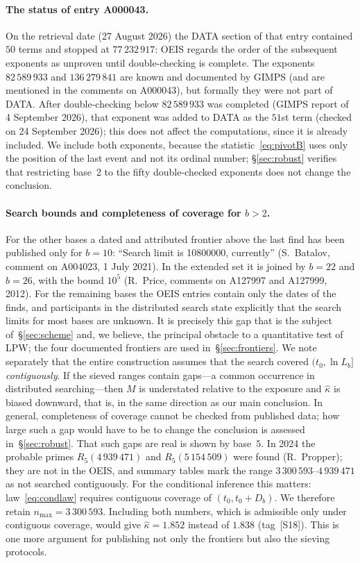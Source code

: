 \documentclass[11pt,a4paper]{article}
\theoremstyle{plain}
\theoremstyle{remark}
\begin{document}
\paragraph{The status of entry A000043.} On the retrieval date (27 August 2026)
the DATA section of that entry contained $50$ terms and stopped at
$77\,232\,917$: OEIS regards the order of the subsequent exponents as unproven
until double-checking is complete. The exponents $82\,589\,933$ and
$136\,279\,841$ are known and documented by GIMPS (and are mentioned in the
comments on A000043), but formally they were not part of DATA. After
double-checking below $82\,589\,933$ was completed (GIMPS report of 4 September
2026), that exponent was added to DATA as the $51$st term (checked on
24 September 2026); this does not affect the computations, since it is already
included. We include both
exponents, because the statistic~\eqref{eq:pivotB} uses only the position
of the last event and not its ordinal number; \S\ref{sec:robust} verifies that
restricting base~2 to the fifty double-checked exponents does not change the
conclusion.

\paragraph{Search bounds and completeness of coverage for $b>2$.} For the other
bases a dated and attributed frontier above the last find has been published
only for $b=10$: ``Search limit is 10800000, currently'' (S.~Batalov, comment
on A004023, 1 July 2021). In the extended set it is joined by $b=22$ and $b=26$,
with the bound $10^5$ (R.~Price, comments on A127997 and A127999, 2012). For the
remaining bases the OEIS entries contain only the dates of the finds, and
participants in the distributed search state explicitly that the search limits
for most bases are unknown. It is precisely this gap that is the subject
of~\S\ref{sec:scheme} and, we believe, the principal obstacle to a quantitative
test of LPW; the four documented frontiers are used in~\S\ref{sec:frontiers}. We
note separately that the entire construction assumes that the search covered
$(t_0,\ln L_b]$ \emph{contiguously}. If the sieved ranges contain gaps---a common
occurrence in distributed searching---then $M$ is understated relative to the
exposure and $\hat\kappa$ is biased downward, that is, in the same direction as
our main conclusion. In general, completeness of coverage cannot be checked from
published data; how large such a gap would have to be to change the conclusion
is assessed in~\S\ref{sec:robust}. That such gaps are real is shown by base~$5$. In 2024 the
probable primes $R_5(4\,939\,471)$ and $R_5(5\,154\,509)$ were found
(R.~Propper); they are not in the OEIS, and summary tables mark the range
$3\,300\,593$--$4\,939\,471$ as not searched contiguously. For the conditional
inference this matters: law~\eqref{eq:condlaw} requires contiguous coverage of
$(t_0,t_0+D_b)$. We therefore retain $n_{\max}=3\,300\,593$. Including both
numbers, which is admissible only under contiguous coverage, would give
$\hat\kappa=1.852$ instead of $1.838$ (tag~[S18]). This is one more argument for
publishing not only the frontiers but also the sieving protocols.
\end{document}
